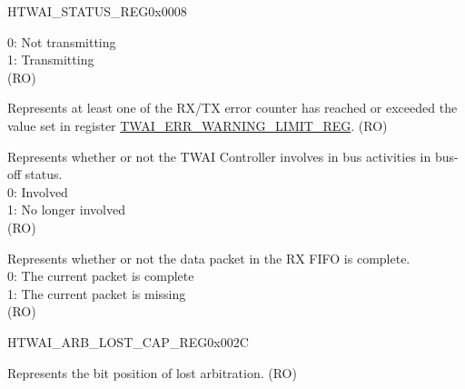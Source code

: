 \begin{register}{H}{TWAI\_STATUS\_REG}{0x0008}
\begin{regdesc}
\begin{reglist}
0: Not transmitting\\
1: Transmitting\\
(RO)
\label{fielddesc:TWAIERRST}\item [TWAI\_ERR\_ST] Represents at least one of the RX/TX error counter has reached or exceeded the value set in register \hyperref[regdesc:TWAIERRWARNINGLIMITREG]{TWAI\_ERR\_WARNING\_LIMIT\_REG}. (RO)
\label{fielddesc:TWAIBUSOFFST}\item [TWAI\_BUS\_OFF\_ST] Represents whether or not the TWAI Controller involves in bus activities in bus-off status. \\
0: Involved\\
1: No longer involved\\
(RO)
\label{fielddesc:TWAIMISSST}\item [TWAI\_MISS\_ST] Represents whether or not the data packet in the RX FIFO is complete. \\
0: The current packet is complete\\
1: The current packet is missing \\
(RO)
\end{reglist}\end{regdesc}
\end{register}


\begin{register}{H}{TWAI\_ARB\_LOST\_CAP\_REG}{0x002C}\label{regdesc:TWAIARBLOSTCAPREG}
%
%
\regnewline%
\begin{regdesc}\begin{reglist}
\label{fielddesc:TWAIARBLOSTCAP}\item [TWAI\_ARB\_LOST\_CAP] Represents the bit position of lost arbitration. (RO)
\end{reglist}\end{regdesc}
\end{register}


